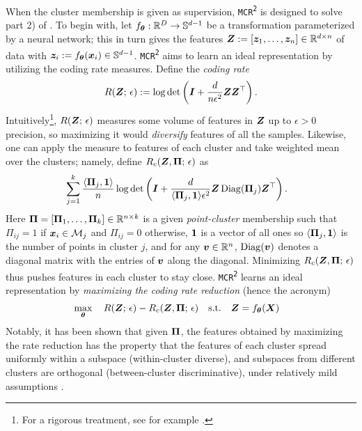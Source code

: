 \documentclass[10pt,twocolumn,letterpaper]{article}
\newcommand{\mcr}{\texttt{MCR\textsuperscript{2}}}
\begin{document}
   When the cluster membership is given as supervision, \mcr{} \cite{Yu2020-mx} is designed to solve part 2) of . To begin with, let $f_{\boldsymbol{\theta}}:{\mathbb{R}}^D \to {\mathbb{S}}^{d-1}$ be a transformation parameterized by a neural network; this in turn gives  the features ${\bm{Z}} := [{\bm{z}}_1, \dots, {\bm{z}}_n]\in {\mathbb{R}}^{d\times n}$ of data with ${\bm{z}}_i:=f_{\boldsymbol{\theta}}({\bm{x}}_i)\in {\mathbb{S}}^{d-1}$. 
   \mcr{} aims to learn an ideal representation by utilizing the coding rate measures. Define the \textit{coding rate}
   \begin{equation}
    R({\bm{Z}};\,\epsilon) := \log\det\left({\bm{I}} + \frac{d}{n\epsilon^2} {\bm{Z}} {\bm{Z}}^\top \right). \nonumber
   \end{equation}
  Intuitively\footnote{ For a rigorous treatment, see for example \cite[\S 2.1]{Ma2007-dx}.}, $R({\bm{Z}};\,\epsilon)$ measures some volume of features in ${\bm{Z}}$ up to $\epsilon>0$ precision, so maximizing it would \textit{diversify} features of all the samples. Likewise, one can apply the measure to features of each cluster and take weighted mean over the clusters; namely, define $R_c({\bm{Z}},\boldsymbol{\Pi};\,\epsilon)$ as 
  \begin{align}
    & \sum_{j=1}^{k} \frac{\langle \boldsymbol{\Pi}_j, {\bm{1}} \rangle}{n}\log\det\left({\bm{I}} + \frac{d}{\langle \boldsymbol{\Pi}_j, {\bm{1}} \rangle \epsilon^2} {\bm{Z}} \operatorname{Diag}(\boldsymbol{\Pi}_j) {\bm{Z}}^\top \right) \nonumber.
  \end{align}
  Here $\boldsymbol{\Pi} = [\boldsymbol{\Pi}_1,\dots,\boldsymbol{\Pi}_k]\in {\mathbb{R}}^{n\times k}$ is a given \textit{point-cluster} membership such that $\Pi_{ij}=1$ if ${\bm{x}}_i \in {\mathcal{M}}_j$ and $\Pi_{ij}=0$ otherwise, ${\bm{1}}$ is a vector of all ones so $\langle \boldsymbol{\Pi}_j, {\bm{1}} \rangle$ is the number of points in cluster $j$, and for any ${\bm{v}}\in{\mathbb{R}}^n$, $\operatorname{Diag}({\bm{v}})$ denotes a diagonal matrix with the entries of ${\bm{v}}$ along the diagonal. Minimizing $R_c({\bm{Z}},\boldsymbol{\Pi};\,\epsilon)$ thus pushes features in each cluster to stay close. \mcr{} learns an ideal representation by \textit{maximizing the coding rate reduction} (hence the acronym)
  \begin{align}
    &\max_{\boldsymbol{\theta}} \quad  R({\bm{Z}};\,\epsilon)-R_c({\bm{Z}},\boldsymbol{\Pi};\,\epsilon)  \quad \text{s.t.} \quad  {\bm{Z}} = f_{\boldsymbol{\theta}}({\bm{X}})  \label{eq:opt-mcr-sup}
   \end{align}
   Notably, it has been shown that given $\boldsymbol{\Pi}$, the features obtained by maximizing the rate reduction has the property that the features of each cluster spread uniformly within a subspace (within-cluster diverse), and subspaces from different clusters are orthogonal (between-cluster discriminative), under relatively mild assumptions \cite[Theorem 2.1]{Yu2020-mx}.
   
\end{document}
